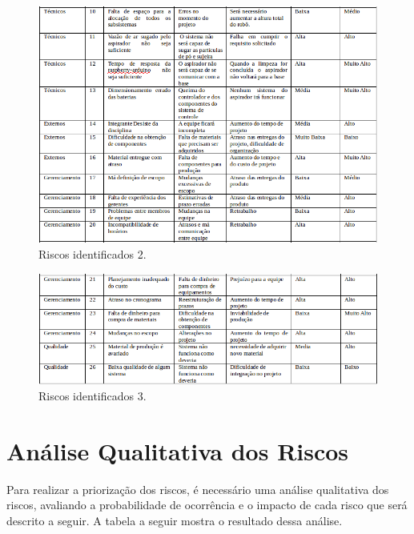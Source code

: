 	\begin{figure}[H]
		\centering
		\includegraphics[scale=0.6]{figuras/riscos2.png}
		\caption{Riscos identificados 2.}
		\label{img:ear}
	\end{figure}

	\begin{figure}[H]
		\centering
		\includegraphics[scale=0.6]{figuras/riscos3.png}
		\caption{Riscos identificados 3.}
		\label{img:ear}
	\end{figure}
	

\section{Análise Qualitativa dos Riscos} %
\label{sec:análise_qualitativa_dos_riscos}

	Para realizar a priorização dos riscos, é necessário uma análise qualitativa dos riscos, avaliando a probabilidade de ocorrência e o impacto de cada risco que será descrito a seguir. A tabela a seguir mostra o resultado dessa análise.

